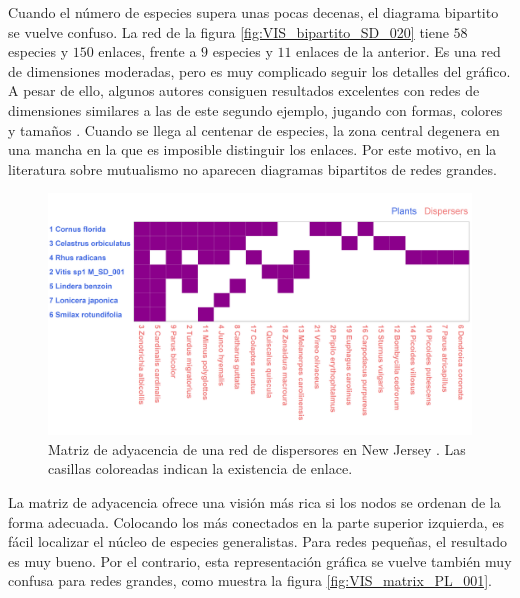 Cuando el número de especies supera unas pocas decenas, el diagrama bipartito se vuelve confuso. La red de la figura \ref{fig:VIS_bipartito_SD_020} tiene $58$ especies y $150$ enlaces, frente a $9$ especies y $11$ enlaces de la anterior. Es una red de dimensiones moderadas, pero es muy complicado seguir los detalles del gráfico. A pesar de ello, algunos autores consiguen resultados excelentes con redes de dimensiones similares a las de este segundo ejemplo, jugando con formas, colores y tamaños \cite{dakos2014critical}. Cuando se llega al centenar de especies, la zona central degenera en una mancha en la que es imposible distinguir los enlaces. Por este motivo, en la literatura sobre mutualismo no aparecen diagramas bipartitos de redes grandes. 

\begin{figure}[h!]
\centering
\includegraphics[scale=0.1]{Figures/VIS_matrix_SD_001.png}
\caption{Matriz de adyacencia de una red de dispersores en New Jersey \cite{baird1980selection}. Las casillas coloreadas indican la existencia de enlace.}
\label{fig:VIS_matrix_SD_001}
\end{figure}

La matriz de adyacencia ofrece una visión más rica si los nodos se ordenan de la forma adecuada. Colocando los más conectados en la parte superior izquierda, es fácil localizar el núcleo de especies generalistas. Para redes pequeñas, el resultado es muy bueno.
Por el contrario, esta representación gráfica se vuelve también muy confusa para redes grandes, como muestra la figura \ref{fig:VIS_matrix_PL_001}.

